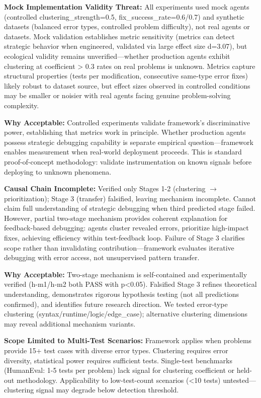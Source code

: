 \textbf{Mock Implementation Validity Threat:} All experiments used mock agents (controlled clustering\_strength=0.5, fix\_success\_rate=0.6/0.7) and synthetic datasets (balanced error types, controlled problem difficulty), not real agents or datasets. Mock validation establishes metric sensitivity (metrics can detect strategic behavior when engineered, validated via large effect size d=3.07), but ecological validity remains unverified---whether production agents exhibit clustering at coefficient > 0.3 rates on real problems is unknown. Metrics capture structural properties (tests per modification, consecutive same-type error fixes) likely robust to dataset source, but effect sizes observed in controlled conditions may be smaller or noisier with real agents facing genuine problem-solving complexity.

\textbf{Why Acceptable:} Controlled experiments validate framework's discriminative power, establishing that metrics work in principle. Whether production agents possess strategic debugging capability is separate empirical question---framework enables measurement when real-world deployment proceeds. This is standard proof-of-concept methodology: validate instrumentation on known signals before deploying to unknown phenomena.

\textbf{Causal Chain Incomplete:} Verified only Stages 1-2 (clustering $\rightarrow$ prioritization); Stage 3 (transfer) falsified, leaving mechanism incomplete. Cannot claim full understanding of strategic debugging when third predicted stage failed. However, partial two-stage mechanism provides coherent explanation for feedback-based debugging: agents cluster revealed errors, prioritize high-impact fixes, achieving efficiency within test-feedback loop. Failure of Stage 3 clarifies scope rather than invalidating contribution---framework evaluates iterative debugging with error access, not unsupervised pattern transfer.

\textbf{Why Acceptable:} Two-stage mechanism is self-contained and experimentally verified (h-m1/h-m2 both PASS with p<0.05). Falsified Stage 3 refines theoretical understanding, demonstrates rigorous hypothesis testing (not all predictions confirmed), and identifies future research direction. We tested error-type clustering (syntax/runtime/logic/edge\_case); alternative clustering dimensions may reveal additional mechanism variants.

\textbf{Scope Limited to Multi-Test Scenarios:} Framework applies when problems provide 15+ test cases with diverse error types. Clustering requires error diversity, statistical power requires sufficient tests. Single-test benchmarks (HumanEval: 1-5 tests per problem) lack signal for clustering coefficient or held-out methodology. Applicability to low-test-count scenarios (<10 tests) untested---clustering signal may degrade below detection threshold.

